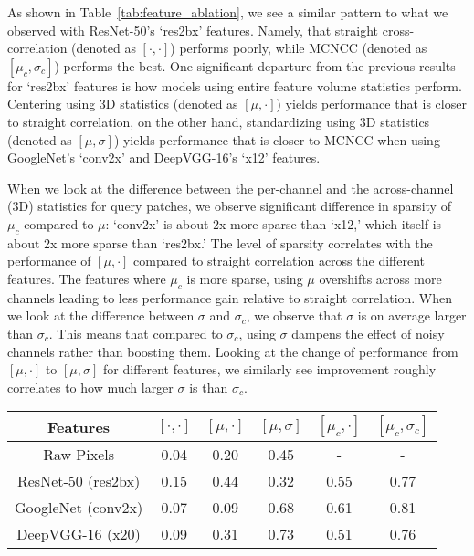 \documentclass[twocolumn]{svjour3}           %
\begin{document}
As shown in Table~\ref{tab:feature_ablation}, we see a similar pattern to what we
observed with ResNet-50's `res2bx' features. Namely, that straight
cross-correlation (denoted as $[\cdot,\cdot]$) performs poorly, while MCNCC
(denoted as $[\mu_c,\sigma_c]$) performs the best. One significant departure
from the previous results for `res2bx' features is how models using entire
feature volume statistics perform. Centering using 3D statistics (denoted as
$[\mu,\cdot]$) yields performance that is closer to straight correlation, on the
other hand, standardizing using 3D statistics (denoted as $[\mu,\sigma]$) yields
performance that is closer to MCNCC when using GoogleNet's `conv2x' and
DeepVGG-16's `x12' features. 

When we look at the difference between the per-channel and the across-channel
(3D) statistics for query patches, we observe significant difference in sparsity
of $\mu_c$ compared to $\mu$: `conv2x' is about 2x more sparse than `x12,' which
itself is about 2x more sparse than `res2bx.' The level of sparsity correlates
with the performance of $[\mu,\cdot]$ compared to straight correlation across
the different features. The features where $\mu_c$ is more sparse, using $\mu$
overshifts across more channels leading to less performance gain relative to
straight correlation. When we look at the difference between
$\sigma$ and $\sigma_c$, we observe that $\sigma$ is on average larger than
$\sigma_c$. This means that compared to $\sigma_c$, using $\sigma$ dampens the
effect of noisy channels rather than boosting them. Looking at the change of
performance from $[\mu,\cdot]$ to $[\mu,\sigma]$ for different features, we
similarly see improvement roughly correlates to how much larger $\sigma$ is
than $\sigma_c$.

\begin{table*}[t]
\begin{center}
\begin{tabular}{c|c|c|c|c|c}
  Features & $[\cdot,\cdot]$ & $[\mu,\cdot]$ & $[\mu,\sigma]$ & $[\mu_c,\cdot]$
  & $[\mu_c,\sigma_c]$ \\\hline
  Raw Pixels & 0.04 & 0.20 & 0.45 & - & - \\
  ResNet-50 (res2bx) & 0.15 & 0.44 & 0.32 & 0.55 & 0.77 \\
  GoogleNet (conv2x) & 0.07 & 0.09 & 0.68 & 0.61 & 0.81 \\
  DeepVGG-16 (x20) & 0.09 & 0.31 & 0.73 & 0.51 & 0.76
\end{tabular}
\end{center}
\caption{Ablation study on the two normalized cross-correlation schemes across
  different features.  We measure performance using mean average precision,
  higher is better.  As the images are gray-scale single-channel images, for
  raw pixels $[\mu,\cdot]$ and $[\mu,\sigma]$ are identical to $[\mu_c,\cdot]$
  and $[\mu_c,\sigma_c]$, respectively.}
\label{tab:feature_ablation}
\end{table*}
\end{document}
